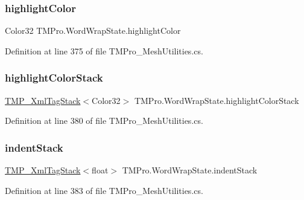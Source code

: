 \mbox{\label{struct_t_m_pro_1_1_word_wrap_state_a5bda490f5876ad01a453a04442e2ccd7}} 
\subsubsection{\texorpdfstring{highlightColor}{highlightColor}}
{\footnotesize\ttfamily Color32 T\+M\+Pro.\+Word\+Wrap\+State.\+highlight\+Color}



Definition at line 375 of file T\+M\+Pro\+\_\+\+Mesh\+Utilities.\+cs.

\mbox{\label{struct_t_m_pro_1_1_word_wrap_state_aab7c976e5f328e4e28b4abeb32485a31}} 
\subsubsection{\texorpdfstring{highlightColorStack}{highlightColorStack}}
{\footnotesize\ttfamily \mbox{\hyperlink{struct_t_m_pro_1_1_t_m_p___xml_tag_stack}{T\+M\+P\+\_\+\+Xml\+Tag\+Stack}}$<$Color32$>$ T\+M\+Pro.\+Word\+Wrap\+State.\+highlight\+Color\+Stack}



Definition at line 380 of file T\+M\+Pro\+\_\+\+Mesh\+Utilities.\+cs.

\mbox{\label{struct_t_m_pro_1_1_word_wrap_state_a7898c7f99240bf8b368ab07e0836b22d}} 
\subsubsection{\texorpdfstring{indentStack}{indentStack}}
{\footnotesize\ttfamily \mbox{\hyperlink{struct_t_m_pro_1_1_t_m_p___xml_tag_stack}{T\+M\+P\+\_\+\+Xml\+Tag\+Stack}}$<$float$>$ T\+M\+Pro.\+Word\+Wrap\+State.\+indent\+Stack}



Definition at line 383 of file T\+M\+Pro\+\_\+\+Mesh\+Utilities.\+cs.


